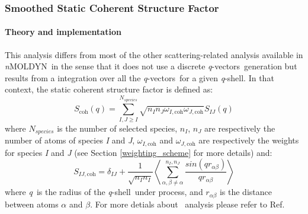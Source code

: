 \documentclass[a4paper,11pt]{report}
\newcommand{\qval}{\textit{q}}
\newcommand{\qvects}{\textit{q}-vectors}
\newcommand{\qshell}{\textit{q}-shell}
\newcommand{\NMOLDYN}{\textit{n}MOLDYN}
\begin{document}
\subsubsection{Smoothed Static Coherent Structure Factor}
\label{sscsf}
\paragraph{Theory and implementation\\}
\label{sscsf_theory}
This analysis differs from most of the other scattering-related analysis available in \NMOLDYN\ in the sense that it does not 
use a discrete \qvects\ generation but results from a integration over all the \qvects\ for a given \qshell. In that 
context, the static coherent structure factor is defined as:
\begin{equation}
S_{\mathrm{coh}}(q) = \sum^{N_{species}}_{I,J \ge I}\sqrt{n_I n_J \omega_{I,\mathrm{coh}}\omega_{J,\mathrm{coh}}} S_{IJ}(q)
\end{equation}
where $N_{species}$ is the number of selected species, $n_I$, $n_J$ are respectively the number of atoms of species \textit{I} and \textit{J}, 
$\omega_{I,\mathrm{coh}}$ and $\omega_{J,\mathrm{coh}}$ are respectively the weights for species \textit{I} and \textit{J} (see Section \ref{weighting_scheme} for more 
details) and:
\begin{equation}
S_{IJ,\mathrm{coh}} = \delta_{IJ} + \frac{1}{\sqrt{n_In_I}}\left\langle\sum_{\alpha, \beta\neq\alpha}^{n_I,n_J} 
\frac{sin(qr_{\alpha\beta})}{qr_{\alpha\beta}}\right\rangle
\end{equation}
where \qval\ is the radius of the \qshell\ under process, and $r_{\alpha\beta}$ is the distance between atoms $\alpha$ and 
$\beta$. For more detials about \SSCSF\ analysis please refer to Ref. \cite{Salmon}
\end{document}
